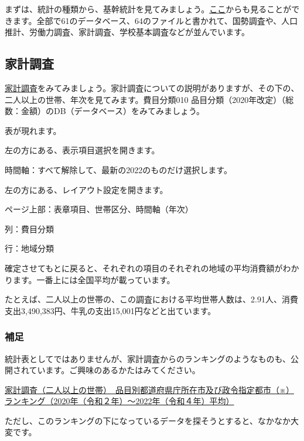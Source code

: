 \documentclass[
  xelatex, ja=standard]{bxjsbook}
\theoremstyle{definition}
\theoremstyle{definition}
\theoremstyle{definition}
\theoremstyle{definition}
\theoremstyle{remark}
\begin{document}
まずは、統計の種類から、基幹統計を見てみましょう。\href{https://www.e-stat.go.jp/stat-search?page=1\&toukei_kind=6\&metadata=1\&data=1}{ここ}からも見ることができます。全部で61のデータベース、64のファイルと書かれて、国勢調査や、人口推計、労働力調査、家計調査、学校基本調査などが並んでいます。

\hypertarget{ux5bb6ux8a08ux8abfux67fb}{%
\subsection{家計調査}\label{ux5bb6ux8a08ux8abfux67fb}}

\href{https://www.e-stat.go.jp/stat-search/database?page=1\&toukei=00200561\&tstat=000000330001\&toukei_kind=6\&metadata=1\&data=1}{家計調査}をみてみましょう。家計調査についての説明がありますが、その下の、二人以上の世帯、年次を見てみます。費目分類010 品目分類（2020年改定）（総数：金額）のDB（データベース）をみてみましょう。

表が現れます。

左の方にある、表示項目選択を開きます。

時間軸：すべて解除して、最新の2022のものだけ選択します。

左の方にある、レイアウト設定を開きます。

ページ上部：表章項目、世帯区分、時間軸（年次）

列：費目分類

行：地域分類

確定させてもとに戻ると、それぞれの項目のそれぞれの地域の平均消費額がわかります。一番上には全国平均が載っています。

たとえば、二人以上の世帯の、この調査における平均世帯人数は、2.91人、消費支出3,490,383円、牛乳の支出15,001円などと出ています。

\hypertarget{ux88dcux8db3}{%
\subsubsection{補足}\label{ux88dcux8db3}}

統計表としてではありませんが、家計調査からのランキングのようなものも、公開されています。ご興味のあるかたはみてください。

\href{https://www.stat.go.jp/data/kakei/5.html}{家計調査（二人以上の世帯）　品目別都道府県庁所在市及び政令指定都市（※）ランキング（2020年（令和２年）～2022年（令和４年）平均）}

ただし、このランキングの下になっているデータを探そうとすると、なかなか大変です。
\end{document}
